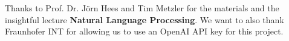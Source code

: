 

{

    Thanks to Prof. Dr. Jörn Hees and Tim Metzler for the materials and the insightful lecture \textbf{Natural Language Processing}.\newline
    We want to also thank Fraunhofer INT for allowing us to use an OpenAI API key for this project.
}

